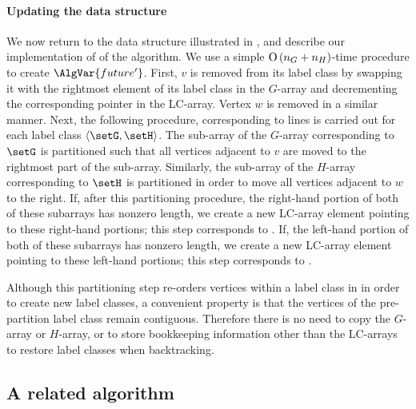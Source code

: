 \paragraph{Updating the data structure}
We now return to the data structure illustrated in , and describe
our implementation of  of the algorithm.
We use a simple $\operatorname{O}\left(n_G+n_H\right)$-time procedure to create $\AlgVar{future'}$.
First, $v$ is removed from its label class by swapping it with the rightmost
element of its label class in the $G$-array and decrementing the corresponding
pointer in the LC-array. Vertex $w$ is removed in a similar manner.
Next, the following procedure, corresponding to lines 
is carried out for each label class $\langle \setG,\setH \rangle$.  The sub-array
of the $G$-array corresponding to $\setG$ is partitioned such that all vertices adjacent to $v$ are moved to
the rightmost part of the sub-array. Similarly, the sub-array of the $H$-array corresponding to $\setH$
is partitioned in order to move all vertices adjacent to $w$ to the right.
If, after this partitioning procedure, the right-hand portion of both of these subarrays
has nonzero length, we create a new LC-array element pointing to these right-hand portions;
this step corresponds to .
If, the left-hand portion of both of these subarrays
has nonzero length, we create a new LC-array element pointing to these left-hand portions;
this step corresponds to .

Although this partitioning step re-orders vertices within a label class in in
order to create new label classes, a convenient property is that the vertices
of the pre-partition label class remain contiguous. Therefore there is no need
to copy the $G$-array or $H$-array, or to store bookkeeping information
other than the LC-arrays to restore label classes when backtracking.

\subsection{A related algorithm}

